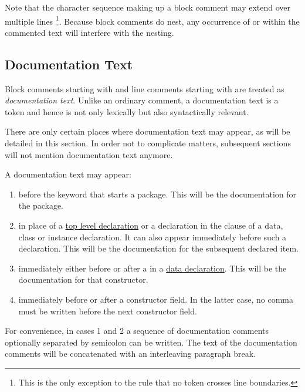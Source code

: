Note that the character sequence making up a block comment may extend over multiple lines
\footnote{This is the only exception to the rule that no token crosses line
boundaries.}. Because block comments do nest, any occurrence of  \regex{-\}} or \regex{\{-} within the
commented text will interfere with the nesting.


\subsection{Documentation Text} \label{doccomment} 

Block comments starting with \regex{\{--} and line comments starting with  \regex{---} are treated as \textit{documentation text}.
Unlike an ordinary comment, a documentation text is a token and hence is not only lexically but also syntactically relevant.

There are only certain places where documentation text may appear, as will be detailed in this section. 
In order not to complicate matters, subsequent sections will not mention documentation text anymore.

A documentation text may appear:
\begin{enumerate}
\item before the  keyword that starts a package. This will be the documentation for the package.
\item in place of a \hyperref[declarations]{top level declaration} or a declaration in the  clause of a data, class or instance declaration. It can also appear immediately before such a declaration.
This will be the documentation for the subsequent declared item. 
\item immediately either before or after a  in a \hyperref[algdcl]{data declaration}. This will be the documentation for that constructor.
\item immediately before or after a constructor field. In the latter case, no comma must be written before the next constructor field. 
\end{enumerate}

For convenience, in cases 1 and 2 a sequence of documentation comments optionally separated by semicolon can be written.
The text of the documentation comments will be concatenated with an interleaving paragraph break.

